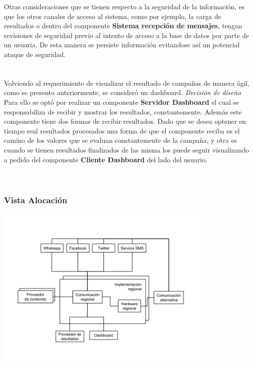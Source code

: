 \documentclass[a4paper, 11pt]{article}
\begin{document}
Otras consideraciones que se tienen respecto a la seguridad de la información, es que los otros canales de acceso al sistema, como por ejemplo, la carga de resultados o dentro del componente \textbf{Sistema recepción de mensajes}, tengan revisiones de seguridad previo al intento de acceso a la base de datos por parte de un usuaria. De esta manera se persiste información evitandose así un potencial ataque de seguridad.\\
\\
\\
Volviendo al requerimiento de visualizar el resultado de campañas de manera ágil, como se presento anteriormente, se consideró un dashboard.
\emph{Decisión de diseño} Para ello se optó por realizar un componente \textbf{Servidor Dashboard} el cual se responsabiliza de recibir y mostrar los resultados, constantemente. Además este componente tiene dos formas de recibir resultados. Dado que se desea optener en tiempo real resultados procesados una forma de que el componente reciba es el camino de los valores que se evaluan constantemente de la campaña, y otra es cuando se tienen resultados finalizados de las misma los puede seguir visualizando a pedido del componente \textbf{Cliente Dashboard} del lado del usuario.\\
\\
\\
\newpage
\subsubsection{Vista Alocación}

\centerline{\includegraphics[width=0.8\textwidth]{./diagramas/VistaAlocacion.png}}
\end{document}
